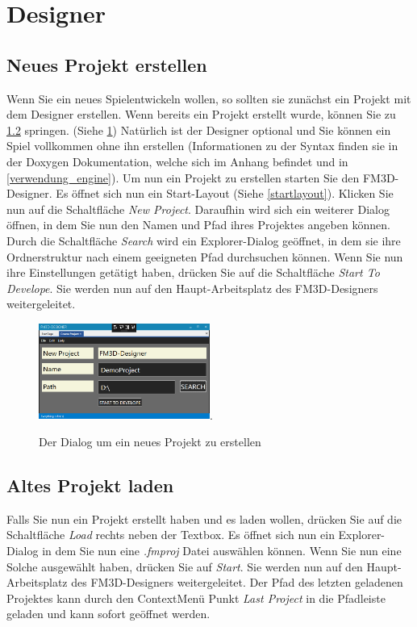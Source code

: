\section{Designer}
\label{verwendung_designer}

\subsection{Neues Projekt erstellen}
\label{neuesprojekt}
Wenn Sie ein neues Spielentwickeln wollen, so sollten sie zunächst ein Projekt mit dem Designer erstellen. Wenn bereits ein Projekt erstellt wurde, können Sie zu \cref{projektladen} springen. (Siehe \cref{createprojekt})
Natürlich ist der Designer optional und Sie können ein Spiel vollkommen ohne ihn erstellen (Informationen zu der Syntax finden sie in der Doxygen Dokumentation, welche sich im Anhang befindet und in \cref{verwendung_engine}).
Um nun ein Projekt zu erstellen starten Sie den FM3D-Designer. Es öffnet sich nun ein Start-Layout (Siehe \cref{startlayout}). Klicken Sie nun auf die Schaltfläche \textit{New Project}. 
Daraufhin wird sich ein weiterer Dialog öffnen, in dem Sie nun den Namen und Pfad ihres Projektes angeben können. Durch die Schaltfläche \textit{Search} wird ein Explorer-Dialog geöffnet, in dem sie ihre Ordnerstruktur nach einem geeigneten Pfad durchsuchen können. Wenn Sie nun ihre Einstellungen getätigt haben, drücken Sie auf die Schaltfläche \textit{Start To Develope}. Sie werden nun auf den Haupt-Arbeitsplatz des FM3D-Designers weitergeleitet.
\begin{figure}
	\begin{center}
		\includegraphics[width=0.5\textwidth]{04verwendung/Designer/00createproject.PNG}.
		\caption{Der Dialog um ein neues Projekt zu erstellen}\label{createprojekt}
	\end{center}
\end{figure}

\subsection{Altes Projekt laden}
\label{projektladen}
Falls Sie nun ein Projekt erstellt haben und es laden wollen, drücken Sie auf die Schaltfläche \textit{Load} rechts neben der Textbox. Es öffnet sich nun ein Explorer-Dialog in dem Sie nun eine \textit{.fmproj} Datei auswählen können. Wenn Sie nun eine Solche ausgewählt haben, drücken Sie auf \textit{Start}. Sie werden nun auf den Haupt-Arbeitsplatz des FM3D-Designers weitergeleitet.
Der Pfad des letzten geladenen Projektes kann durch den ContextMenü Punkt \textit{Last Project} in die Pfadleiste geladen und kann sofort geöffnet werden.

